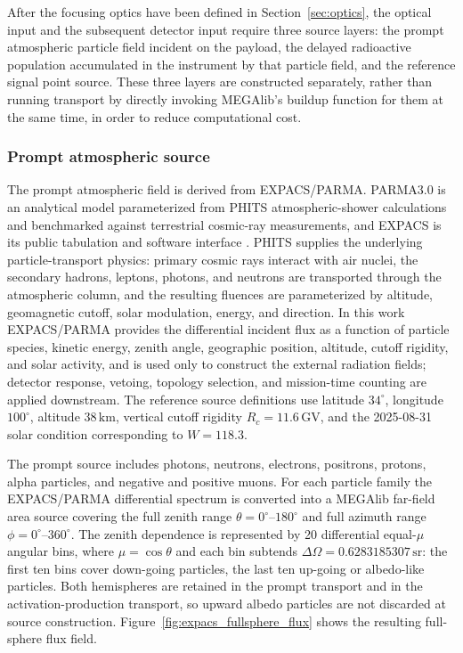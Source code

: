 \documentclass[pdflatex,sn-mathphys-num]{sn-jnl}
\begin{document}
After the focusing optics have been defined in Section~\ref{sec:optics}, the
optical input and the subsequent detector input require three source layers: the
prompt atmospheric particle field incident on the payload, the delayed
radioactive population accumulated in the instrument by that particle field, and
the reference signal point source. These three layers are constructed
separately, rather than running transport by directly invoking MEGAlib's buildup
function for them at the same time, in order to reduce computational cost.

\subsubsection{Prompt atmospheric source}
\label{subsec:prompt_source}

The prompt atmospheric field is derived from EXPACS/PARMA. PARMA3.0 is an
analytical model parameterized from PHITS atmospheric-shower calculations and
benchmarked against terrestrial cosmic-ray measurements, and EXPACS is its
public tabulation and software interface
\cite{Sato2015EXPACS,Sato2016PARMA4}. PHITS supplies the underlying
particle-transport physics: primary cosmic rays interact with air nuclei, the
secondary hadrons, leptons, photons, and neutrons are transported through the
atmospheric column, and the resulting fluences are parameterized by altitude,
geomagnetic cutoff, solar modulation, energy, and direction. In this work
EXPACS/PARMA provides the differential incident flux as a function of particle
species, kinetic energy, zenith angle, geographic position, altitude, cutoff
rigidity, and solar activity, and is used only to construct the external
radiation fields; detector response, vetoing, topology selection, and
mission-time counting are applied downstream. The reference source definitions
use latitude $34^\circ$, longitude $100^\circ$, altitude $38\,\mathrm{km}$,
vertical cutoff rigidity $R_c=11.6\,\mathrm{GV}$, and the 2025-08-31 solar
condition corresponding to $W=118.3$.

The prompt source includes photons, neutrons, electrons, positrons, protons,
alpha particles, and negative and positive muons. For each particle family the
EXPACS/PARMA differential spectrum is converted into a MEGAlib far-field area
source covering the full zenith range $\theta=0^\circ$--$180^\circ$ and full
azimuth range $\phi=0^\circ$--$360^\circ$. The zenith dependence is represented
by 20 differential equal-$\mu$ angular bins, where $\mu=\cos\theta$ and each
bin subtends $\Delta\Omega=0.6283185307\,\mathrm{sr}$: the first ten bins cover
down-going particles, the last ten up-going or albedo-like particles. Both
hemispheres are retained in the prompt transport and in the
activation-production transport, so upward albedo particles are not discarded
at source construction. Figure~\ref{fig:expacs_fullsphere_flux} shows the
resulting full-sphere flux field.
\end{document}

